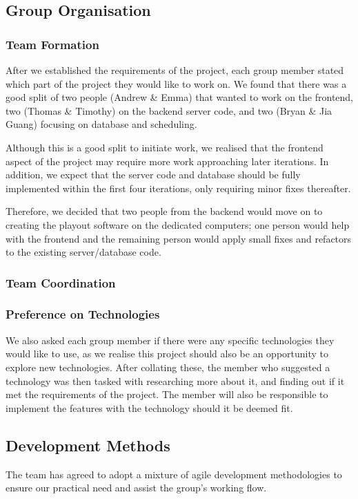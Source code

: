 \documentclass[a4paper, titlepage]{article}
\begin{document}
\subsection{Group Organisation} \label{sec:projman_group}

\subsubsection{Team Formation}
After we established the requirements of the project, each group member stated
which part of the project they would like to work on. We found that there was a
good split of two people (Andrew \& Emma) that wanted to work on the frontend,
two (Thomas \& Timothy) on the backend server code, and two (Bryan \& Jia Guang)
focusing on database and scheduling.

Although this is a good split to initiate work, we realised that the frontend 
aspect of the project may require more work approaching later iterations.
In addition, we expect that the server code and database should be fully 
implemented within the first four iterations, only requiring minor fixes thereafter.

Therefore, we decided that two people from the backend would move on to creating
the playout software on the dedicated computers; one person would help with the
frontend and the remaining person would apply small fixes and refactors to the
existing server/database code.

\subsubsection{Team Coordination}


\subsubsection{Preference on Technologies}
We also asked each group member if there were any specific technologies they 
would like to use, as we realise this project should also be an opportunity to explore new
technologies. After collating these, the member who suggested a technology was then 
tasked with researching more about it, and finding out if it met the requirements of the project.
The member will also be responsible to implement the features with the technology should it be
deemed fit.



\subsection{Development Methods} \label{sec:projman_devprocess}
The team has agreed to adopt a mixture of agile development methodologies to
ensure our practical need and assist the group's working flow.
\end{document}
